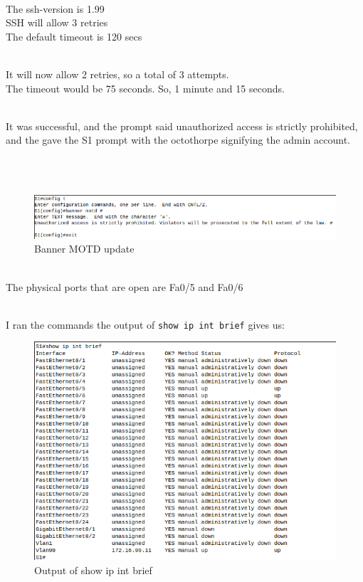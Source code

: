 \documentclass[../EngineeringJournal_CDavis.tex]{subfiles}
\begin{document}
\clearpage

\noindent{}\\
The ssh-version is 1.99\\
SSH will allow 3 retries\\
The default timeout is 120 secs


\noindent{}\\
It will now allow 2 retries, so a total of 3 attempts.\\
The timeout would be 75 seconds. So, 1 minute and 15 seconds.


\\
It was successful, and the prompt said unauthorized access is strictly
prohibited, and the gave the S1 prompt with the octothorpe signifying the admin
account.


\noindent{}\\


\\

\begin{figure}[!hbt]\centering
\includegraphics[width=.75\linewidth]{Figures/2020-02-26-035114_701x102_scrot.png}\par
\caption{Banner MOTD update}\label{Banner10}
\end{figure}

\\
The physical ports that are open are Fa0/5 and Fa0/6


\\
I ran the commands the output of 
{\scriptsize{\verb$show ip int brief$}\normalsize} gives us:


\begin{figure}[!hbt]\centering
\includegraphics[width=.69\linewidth]{Figures/2020-02-26-040122_601x435_scrot.png}\par
\caption{Output of show ip int brief }\label{Intbrief10}
\end{figure}
\end{document}
